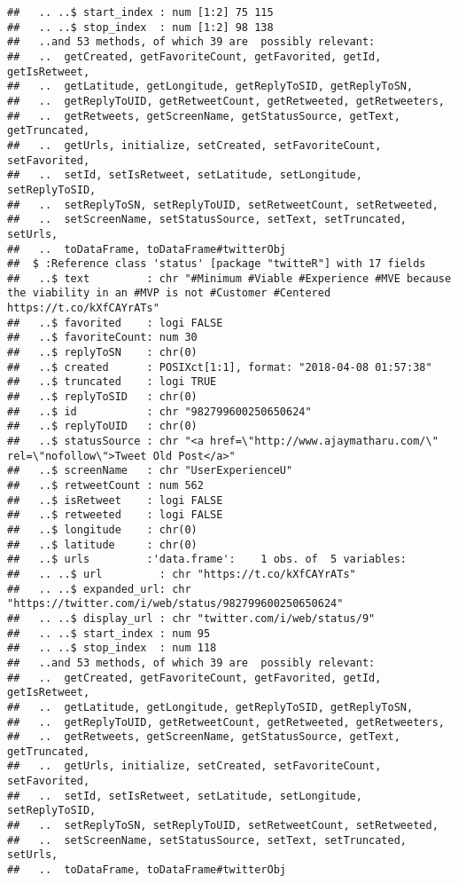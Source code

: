 \documentclass[]{article}
\begin{document}
\begin{verbatim}
##   .. ..$ start_index : num [1:2] 75 115
##   .. ..$ stop_index  : num [1:2] 98 138
##   ..and 53 methods, of which 39 are  possibly relevant:
##   ..  getCreated, getFavoriteCount, getFavorited, getId, getIsRetweet,
##   ..  getLatitude, getLongitude, getReplyToSID, getReplyToSN,
##   ..  getReplyToUID, getRetweetCount, getRetweeted, getRetweeters,
##   ..  getRetweets, getScreenName, getStatusSource, getText, getTruncated,
##   ..  getUrls, initialize, setCreated, setFavoriteCount, setFavorited,
##   ..  setId, setIsRetweet, setLatitude, setLongitude, setReplyToSID,
##   ..  setReplyToSN, setReplyToUID, setRetweetCount, setRetweeted,
##   ..  setScreenName, setStatusSource, setText, setTruncated, setUrls,
##   ..  toDataFrame, toDataFrame#twitterObj
##  $ :Reference class 'status' [package "twitteR"] with 17 fields
##   ..$ text         : chr "#Minimum #Viable #Experience #MVE because the viability in an #MVP is not #Customer #Centered https://t.co/kXfCAYrATs"
##   ..$ favorited    : logi FALSE
##   ..$ favoriteCount: num 30
##   ..$ replyToSN    : chr(0) 
##   ..$ created      : POSIXct[1:1], format: "2018-04-08 01:57:38"
##   ..$ truncated    : logi TRUE
##   ..$ replyToSID   : chr(0) 
##   ..$ id           : chr "982799600250650624"
##   ..$ replyToUID   : chr(0) 
##   ..$ statusSource : chr "<a href=\"http://www.ajaymatharu.com/\" rel=\"nofollow\">Tweet Old Post</a>"
##   ..$ screenName   : chr "UserExperienceU"
##   ..$ retweetCount : num 562
##   ..$ isRetweet    : logi FALSE
##   ..$ retweeted    : logi FALSE
##   ..$ longitude    : chr(0) 
##   ..$ latitude     : chr(0) 
##   ..$ urls         :'data.frame':    1 obs. of  5 variables:
##   .. ..$ url         : chr "https://t.co/kXfCAYrATs"
##   .. ..$ expanded_url: chr "https://twitter.com/i/web/status/982799600250650624"
##   .. ..$ display_url : chr "twitter.com/i/web/status/9"
##   .. ..$ start_index : num 95
##   .. ..$ stop_index  : num 118
##   ..and 53 methods, of which 39 are  possibly relevant:
##   ..  getCreated, getFavoriteCount, getFavorited, getId, getIsRetweet,
##   ..  getLatitude, getLongitude, getReplyToSID, getReplyToSN,
##   ..  getReplyToUID, getRetweetCount, getRetweeted, getRetweeters,
##   ..  getRetweets, getScreenName, getStatusSource, getText, getTruncated,
##   ..  getUrls, initialize, setCreated, setFavoriteCount, setFavorited,
##   ..  setId, setIsRetweet, setLatitude, setLongitude, setReplyToSID,
##   ..  setReplyToSN, setReplyToUID, setRetweetCount, setRetweeted,
##   ..  setScreenName, setStatusSource, setText, setTruncated, setUrls,
##   ..  toDataFrame, toDataFrame#twitterObj

\end{verbatim}
\end{document}

